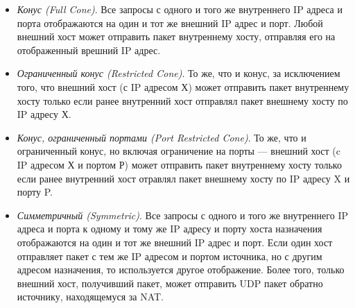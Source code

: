 \begin{itemize}[label=---]
  \item \textit{Конус (Full Cone)}.
  Все запросы с одного и того же внутреннего IP адреса и порта отображаются на один и тот же внешний IP адрес и порт.
  Любой внешний хост может отправить пакет внутреннему хосту, отправляя его на отображенный врешний IP адрес.

  \item \textit{Ограниченный конус (Restricted Cone)}.
  То же, что и конус, за исключением того, что внешний хост (с IP адресом Х) может отправить пакет внутреннему хосту только если ранее внутренний хост отправлял пакет внешнему хосту по IP адресу Х.
  
  \item \textit{Конус, ограниченный портами (Port Restricted Cone)}.
  То же, что и ограниченный конус, но включая ограничение на порты --- внешний хост (c IP адресом Х и портом Р) может отправить пакет внутреннему хосту только если ранее внутренний хост отравлял пакет внешнему хосту по IP адресу X и порту P.
  
  \item \textit{Симметричный (Symmetric)}.
  Все запросы с одного и того же внутреннего IP адреса и порта к одному и тому же IP адресу и порту хоста назначения отображаются на один и тот же внешний IP адрес и порт.
  Если один хост отправляет пакет с тем же IP адресом и портом источника, но с другим адресом назначения, то используется другое отображение.
  Более того, только внешний хост, получивший пакет, может отправить UDP пакет обратно источнику, находящемуся за NAT. 
\end{itemize}

